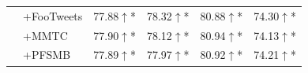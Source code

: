 \begin{tabular}{llcccc}
 & +FooTweets & 77.88\colorbox{mygreen}{$\uparrow$}* & 78.32\colorbox{mygreen}{$\uparrow$}* & 80.88\colorbox{mygreen}{$\uparrow$}* & 74.30\colorbox{mygreen}{$\uparrow$}* \\
 & +MMTC & 77.90\colorbox{mygreen}{$\uparrow$}* & 78.12\colorbox{mygreen}{$\uparrow$}* & 80.94\colorbox{mygreen}{$\uparrow$}* & 74.13\colorbox{mygreen}{$\uparrow$}* \\
 & +PFSMB & 77.89\colorbox{mygreen}{$\uparrow$}* & 77.97\colorbox{mygreen}{$\uparrow$}* & 80.92\colorbox{mygreen}{$\uparrow$}* & 74.21\colorbox{mygreen}{$\uparrow$}* \\
\bottomrule
\end{tabular}
